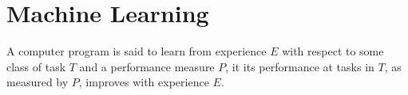 \section{Machine Learning}
A computer program is said to learn from experience $E$ with respect to some class
of task $T$ and a performance measure $P$, it its performance at tasks in $T$, as
measured by $P$, improves with experience $E$.
